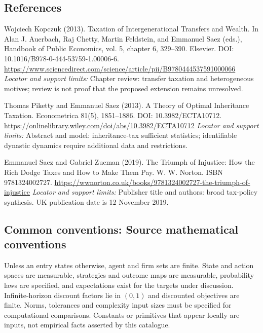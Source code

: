 \documentclass[11pt,a4paper]{article}
\begin{document}
\subsection*{References}
\begin{enumerate}[label={[S\arabic*]},leftmargin=*,itemsep=0.6em]
\item Wojciech Kopczuk (2013). Taxation of Intergenerational Transfers and Wealth. In Alan J. Auerbach, Raj Chetty, Martin Feldstein, and Emmanuel Saez (eds.), Handbook of Public Economics, vol. 5, chapter 6, 329--390. Elsevier. DOI: 10.1016/B978-0-444-53759-1.00006-6.
\url{https://www.sciencedirect.com/science/article/pii/B9780444537591000066}
\newline\emph{Locator and support limits:} Chapter review: transfer taxation and heterogeneous motives; review is not proof that the proposed extension remains unresolved.
\item Thomas Piketty and Emmanuel Saez (2013). A Theory of Optimal Inheritance Taxation. Econometrica 81(5), 1851--1886. DOI: 10.3982/ECTA10712.
\url{https://onlinelibrary.wiley.com/doi/abs/10.3982/ECTA10712}
\newline\emph{Locator and support limits:} Abstract and model: inheritance-tax sufficient statistics; identifiable dynastic dynamics require additional data and restrictions.
\item Emmanuel Saez and Gabriel Zucman (2019). The Triumph of Injustice: How the Rich Dodge Taxes and How to Make Them Pay. W. W. Norton. ISBN 9781324002727.
\url{https://wwnorton.co.uk/books/9781324002727-the-triumph-of-injustice}
\newline\emph{Locator and support limits:} Publisher title and authors: broad tax-policy synthesis. UK publication date is 12 November 2019.
\end{enumerate}

\subsection*{Common conventions: Source mathematical conventions}

Unless an entry states otherwise, agent and firm sets are finite. State and action spaces are measurable, strategies and outcome maps are measurable, probability laws are specified, and expectations exist for the targets under discussion. Infinite-horizon discount factors lie in $(0,1)$ and discounted objectives are finite. Norms, tolerances and complexity input sizes must be specified for computational comparisons. Constants or primitives that appear locally are inputs, not empirical facts asserted by this catalogue.
\end{document}
